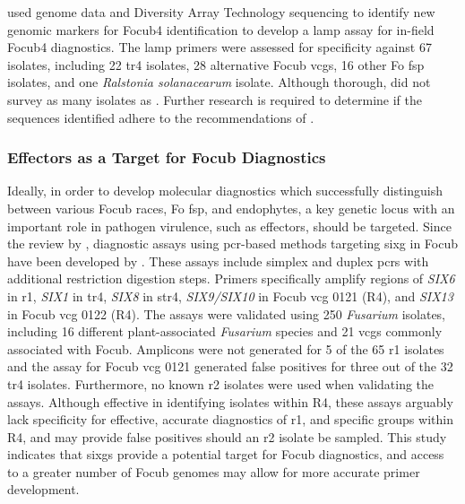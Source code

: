 \textcite{Ordonez2019} used genome data and Diversity Array Technology sequencing to identify new genomic markers for \ac{Focub4} identification to develop a \ac{lamp} assay for in-field \ac{Focub4} diagnostics. The \ac{lamp} primers were assessed for specificity against 67 isolates, including 22 \ac{tr4} isolates, 28 alternative \ac{Focub} \acp{vcg}, 16 other \ac{Fo} \ac{fsp} isolates, and one \textit{Ralstonia solanacearum} isolate. Although thorough, \textcite{Ordonez2019}  did not survey as many isolates as \textcite{Magdama2019}. Further research is required to determine if the sequences identified adhere to the recommendations of \textcite{Magdama2019}. 

\subsubsection{Effectors as a Target for \acl{Focub} Diagnostics}

Ideally, in order to develop molecular diagnostics which successfully distinguish between various \ac{Focub} races, \ac{Fo} \ac{fsp}, and endophytes, a key genetic locus with an important role in pathogen virulence, such as effectors, should be targeted. Since the review by \textcite{Magdama2019}, diagnostic assays using \ac{pcr}-based methods targeting \ac{sixg} in \ac{Focub} have been developed by \textcite{Carvalhais2019}. These assays include simplex and duplex \acp{pcr} with additional restriction digestion steps. Primers specifically amplify regions of \textit{SIX6} in \ac{r1}, \textit{SIX1} in \ac{tr4}, \textit{SIX8} in \ac{str4}, \textit{SIX9/SIX10} in \ac{Focub} \ac{vcg} 0121 (R4), and \textit{SIX13} in \ac{Focub} \ac{vcg} 0122 (R4). The assays were validated using 250 \textit{Fusarium} isolates, including 16 different plant-associated \textit{Fusarium} species and 21 \acp{vcg}  commonly associated with \ac{Focub}. Amplicons were not generated for 5 of the 65 \ac{r1} isolates and the assay for \ac{Focub} \ac{vcg} 0121 generated false positives for three out of the 32 \ac{tr4} isolates. Furthermore, no known \ac{r2} isolates were used when validating the assays. Although effective in identifying isolates within R4, these assays arguably lack specificity for effective, accurate diagnostics of \ac{r1}, and specific groups within R4, and may provide false positives should an \ac{r2} isolate be sampled. This study indicates that \acp{sixg} provide a potential target for \ac{Focub} diagnostics, and access to a greater number of \ac{Focub} genomes may allow for more accurate primer development.  

